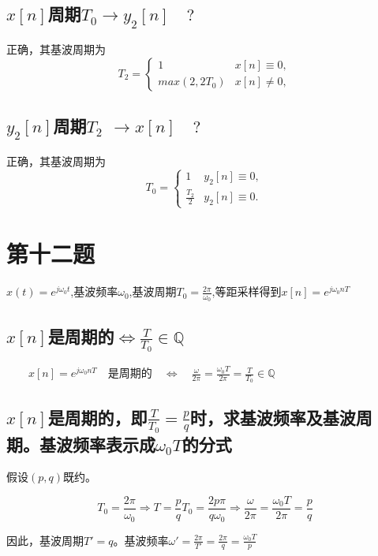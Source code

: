 \documentclass[UTF8, fontset=fandol,12pt, a4paper]{ctexart}
\begin{document}
\subsection{$x[n]$周期$T_0 \longrightarrow y_2[n] \quad ?$}

正确，其基波周期为
$$T_2 = \begin{cases}
  1 & x[n] \equiv 0, \\
  max(2, 2T_0) & x[n] \ne 0,
\end{cases}$$

\subsection{$y_2[n]$周期$T_2$ $\longrightarrow x[n] \quad ?$}

正确，其基波周期为
$$T_0 = \begin{cases}
  1 & y_2[n] \equiv 0, \\
  \frac{T_2}{2} & y_2[n] \equiv 0.
\end{cases}$$

\section* {第十二题}

$x(t)=e^{j\omega_0 t}$,基波频率$\omega_0$,基波周期$T_0=\frac{2\pi}{\omega_0}$,等距采样得到$x[n]=e^{j\omega_0nT}$

\subsection{$x[n]$是周期的$\Leftrightarrow \frac{T}{T_0} \in \mathbb{Q}$}

$\qquad x[n]=e^{j\omega_0nT} 
\quad$是周期的$\quad \Leftrightarrow \quad\frac{\omega}{2\pi} = \frac{\omega_0 T}{2\pi} = \frac{T}{T_0}\in \mathbb{Q}$

\subsection{$x[n]$是周期的，即$\frac{T}{T_0}=\frac{p}{q}$时，求基波频率及基波周期。基波频率表示成$\omega_0T$的分式}

假设$(p, q)$既约。

$$T_0 = \frac{2\pi}{\omega_0} \Rightarrow T = \frac{p}{q} T_0 = \frac{2p\pi}{q\omega_0} \Rightarrow \frac{\omega}{2\pi} = \frac{\omega_0 T}{2\pi} = \frac{p}{q}$$

因此，基波周期$T'=q$。基波频率$\omega'=\frac{2\pi}{T'}=\frac{2\pi}{q}=\frac{\omega_0 T}{p}$ 
\end{document}
